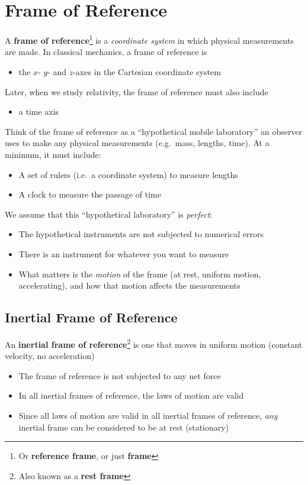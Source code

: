 \section{Frame of Reference}
A \textbf{frame of reference}\footnote{Or \textbf{reference frame}, or just
\textbf{frame}} is a \emph{coordinate system} in which physical
measurements are made. In classical mechanics, a frame of reference is
\begin{itemize}
\item the $x$- $y$- and $z$-axes in the Cartesian coordinate system
\end{itemize}
Later, when we study relativity, the frame of reference must also include
\begin{itemize}
\item a time axis
\end{itemize}




Think of the frame of reference as a ``hypothetical mobile laboratory'' an
observer uses to make any physical measurements (e.g.\ mass, lengths, time).
At a minimum,
it must include:
\begin{itemize}
\item A set of rulers (i.e.\ a coordinate system) to measure lengths
\item A clock to measure the passage of time
\end{itemize}
We assume that this ``hypothetical laboratory'' is \emph{perfect}:
\begin{itemize}
\item The hypothetical instruments are not subjected to numerical errors
\item There is an instrument for whatever you want to measure
\item What matters is the \emph{motion} of the frame (at rest, uniform
  motion, accelerating), and how that motion affects the measurements
\end{itemize}




\subsection{Inertial Frame of Reference}
An \textbf{inertial frame of reference}\footnote{Also known as a
\textbf{rest frame}} is one that moves in uniform motion (constant
velocity, no acceleration)
\begin{itemize}
\item The frame of reference is not subjected to any net force
\item In all inertial frames of reference, the laws of motion are valid
\item Since all laws of motion are valid in all inertial frames of reference,
  \emph{any} inertial frame can be considered to be at rest (stationary)
\end{itemize}




